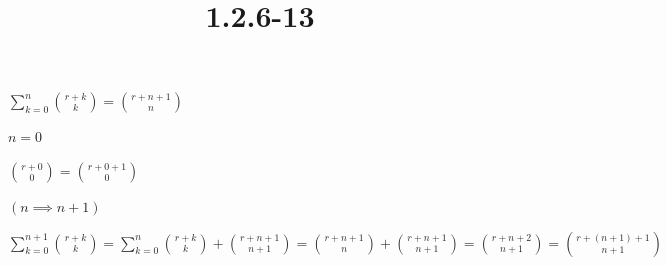 \documentclass{article}
\title{1.2.6-13}
\begin{document}
\maketitle

\( \sum_{k=0}^n \binom{r+k}{k} = \binom{r+n+1}{n} \)

\( n = 0 \)

\( \binom{r+0}{0} = \binom{r+0+1}{0} \)

\( (n \implies n + 1) \)

\( \sum_{k=0}^{n+1} \binom{r+k}{k} = \sum_{k=0}^{n} \binom{r+k}{k} + \binom{r+n+1}{n+1} = \binom{r+n+1}{n} + \binom{r+n+1}{n+1} = \binom{r+n+2}{n+1} = \binom{r+(n+1)+1}{n+1} \)
\end{document}
